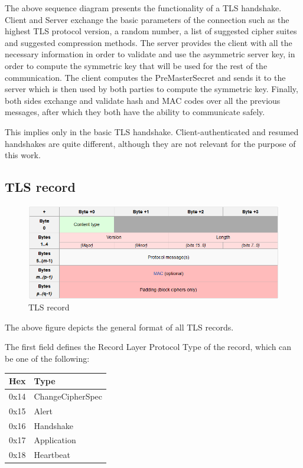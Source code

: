 The above sequence diagram presents the functionality of a TLS handshake.
Client and Server exchange the basic parameters of the connection such as 
the highest TLS protocol version, a random number, a list of suggested cipher 
suites and suggested compression methods. The server provides the client with all
the necessary information in order to validate and use the asymmetric server key, in order
to compute the symmetric key that will be used for the rest of the communication.
The client computes the  PreMasterSecret and sends it to the server 
which is then used by both parties to compute the symmetric key.
Finally, both sides exchange and validate hash and MAC codes over all the
previous messages, after which they both have the ability to communicate safely.

This implies only in the basic TLS handshake. Client-authenticated and resumed handshakes
are quite different, although they are not relevant for the purpose of this work.


\subsection{TLS record}

\begin{figure}[H] \caption{TLS record} \centering
\includegraphics[width=1\textwidth]{diagrams/tls_record.png}\end{figure}

The above figure depicts the general format of all TLS records.

The first field defines the Record Layer Protocol Type of the record, which can
be one of the following:

\begin{table}[H] \centering \begin{tabular}{ | l | l | } \hline \textbf{Hex} &
\textbf{Type} \\ \hline 0x14 & ChangeCipherSpec \\ 0x15 & Alert \\ 0x16 &
Handshake \\ 0x17 & Application \\ 0x18 & Heartbeat \\ \hline \end{tabular}
\end{table}

